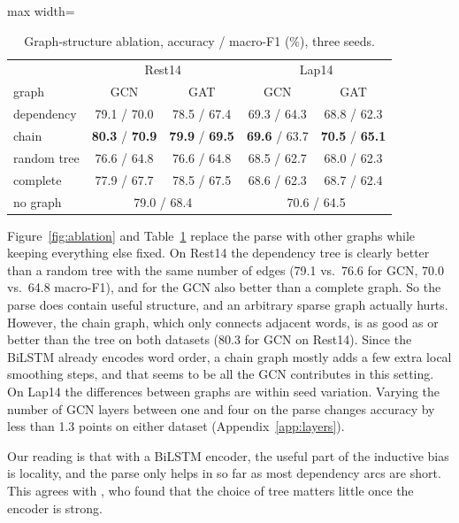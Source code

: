 \documentclass[11pt]{article}
\begin{document}
\begin{table}[t]
\centering
\small
\setlength{\tabcolsep}{3.5pt}
\begin{adjustbox}{max width=\columnwidth}
\begin{tabular}{lcccc}
\toprule
 & \multicolumn{2}{c}{Rest14} & \multicolumn{2}{c}{Lap14} \\
graph & GCN & GAT & GCN & GAT \\
\midrule
dependency & 79.1 / 70.0 & 78.5 / 67.4 & 69.3 / 64.3 & 68.8 / 62.3 \\
chain & \textbf{80.3} / \textbf{70.9} & \textbf{79.9} / \textbf{69.5} & \textbf{69.6} / 63.7 & \textbf{70.5} / \textbf{65.1} \\
random tree & 76.6 / 64.8 & 76.6 / 64.8 & 68.5 / 62.7 & 68.0 / 62.3 \\
complete & 77.9 / 67.7 & 78.5 / 67.5 & 68.6 / 62.3 & 68.7 / 62.4 \\
\midrule
no graph & \multicolumn{2}{c}{79.0 / 68.4} & \multicolumn{2}{c}{70.6 / 64.5} \\
\bottomrule
\end{tabular}
\end{adjustbox}
\caption{Graph-structure ablation, accuracy / macro-F1 (\%), three seeds.}
\label{tab:ablation}
\end{table}

Figure~\ref{fig:ablation} and Table~\ref{tab:ablation} replace the parse with other graphs while keeping everything else fixed. On Rest14 the dependency tree is clearly better than a random tree with the same number of edges (79.1 vs.\ 76.6 for GCN, 70.0 vs.\ 64.8 macro-F1), and for the GCN also better than a complete graph. So the parse does contain useful structure, and an arbitrary sparse graph actually hurts. However, the chain graph, which only connects adjacent words, is as good as or better than the tree on both datasets (80.3 for GCN on Rest14). Since the BiLSTM already encodes word order, a chain graph mostly adds a few extra local smoothing steps, and that seems to be all the GCN contributes in this setting. On Lap14 the differences between graphs are within seed variation. Varying the number of GCN layers between one and four on the parse changes accuracy by less than 1.3 points on either dataset (Appendix~\ref{app:layers}).

Our reading is that with a BiLSTM encoder, the useful part of the inductive bias is locality, and the parse only helps in so far as most dependency arcs are short. This agrees with \citet{dai-etal-2021-syntax}, who found that the choice of tree matters little once the encoder is strong.
\end{document}

